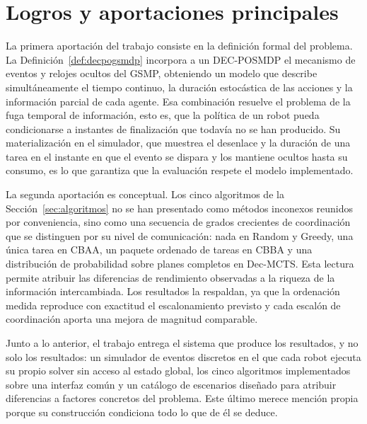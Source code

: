 \section{Logros y aportaciones principales} \label{sec:conc-logros}

La primera aportación del trabajo consiste en la definición formal del problema. La Definición~\ref{def:decpogsmdp} incorpora a un DEC-POSMDP el mecanismo de eventos y relojes ocultos del GSMP, obteniendo un modelo que describe simultáneamente el tiempo continuo, la duración estocástica de las acciones y la información parcial de cada agente. Esa combinación resuelve el problema de la fuga temporal de información, esto es, que la política de un robot pueda condicionarse a instantes de finalización que todavía no se han producido. Su materialización en el simulador, que muestrea el desenlace y la duración de una tarea en el instante en que el evento se dispara y los mantiene ocultos hasta su consumo, es lo que garantiza que la evaluación respete el modelo implementado.

La segunda aportación es conceptual. Los cinco algoritmos de la Sección~\ref{sec:algoritmos} no se han presentado como métodos inconexos reunidos por conveniencia, sino como una secuencia de grados crecientes de coordinación que se distinguen por su nivel de comunicación: nada en Random y Greedy, una única tarea en CBAA, un paquete ordenado de tareas en CBBA y una distribución de probabilidad sobre planes completos en Dec-MCTS. Esta lectura permite atribuir las diferencias de rendimiento observadas a la riqueza de la información intercambiada. Los resultados la respaldan, ya que la ordenación medida reproduce con exactitud el escalonamiento previsto y cada escalón de coordinación aporta una mejora de magnitud comparable.

Junto a lo anterior, el trabajo entrega el sistema que produce los resultados, y no solo los resultados: un simulador de eventos discretos en el que cada robot ejecuta su propio solver sin acceso al estado global, los cinco algoritmos implementados sobre una interfaz común y un catálogo de escenarios diseñado para atribuir diferencias a factores concretos del problema. Este último merece mención propia porque su construcción condiciona todo lo que de él se deduce. 

